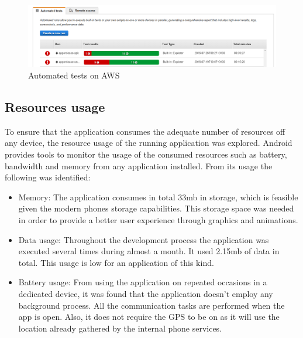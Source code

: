 \begin{figure}[H]
\begin{adjustbox}{width=1\textwidth,center=\textwidth}
  \centering
  \includegraphics[scale=1]{images/automated_tests.png}
\end{adjustbox}
  \caption[Automated tests on AWS]{Automated tests on AWS}
  \label{fig:automated_tests}
\end{figure}

\subsection{Resources usage}
To ensure that the application consumes the adequate number of resources off any device, the resource usage of the running application was explored. Android provides tools to monitor the usage of the consumed resources such as battery, bandwidth and memory from any application installed. From its usage the following was identified:
\begin{itemize}
    \item Memory: The application consumes in total 33mb in storage, which is feasible given the modern phones storage capabilities. This storage space was needed in order to provide a better user experience through graphics and animations.
    \item Data usage: Throughout the development process the application was executed several times during almost a month. It used 2.15mb of data in total. This usage is low for an application of this kind.
    \item Battery usage: From using the application on repeated occasions in a dedicated device, it was found that the application doesn't employ any background process. All the communication tasks are performed when the app is open. Also, it does not require the GPS to be on as it will use the location already gathered by the internal phone services.
\end{itemize}


